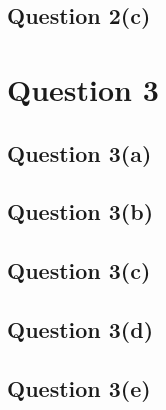 \documentclass[10pt,a4paper]{article}
\begin{document}
\subsection{Question 2(c)}

\section{Question 3}
\subsection{Question 3(a)}
\subsection{Question 3(b)}
\subsection{Question 3(c)}
\subsection{Question 3(d)}
\subsection{Question 3(e)}


\end{document}
